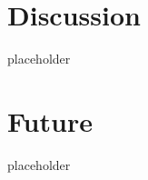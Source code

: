 \documentclass[
	a4paper, %
	10pt, %
	unnumberedsections, %
	twoside, %
]{t0004}
\begin{document}
\section{Discussion}

placeholder

\section{Future}

placeholder





\end{document}
